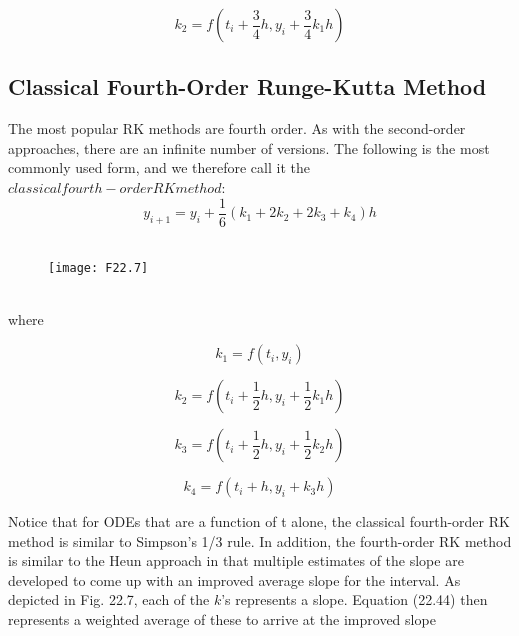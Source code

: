 \documentclass[../main.tex]{subfiles}
\begin{document}
\begin{equation}
\tag{22.43b}
k_2 = f \left(t_i + \dfrac{3}{4}h, y_i + \dfrac{3}{4}k_1h \right)
\end{equation}
 
 \subsection{Classical Fourth-Order Runge-Kutta Method}

 The most popular RK methods are fourth order. As with the second-order approaches, there
are an infinite number of versions. The following is the most commonly used form, and we
therefore call it the $classical fourth-order RK method$:
\begin{equation}
\tag{22.44}
y_{i+1} = y_i + \dfrac{1}{6} (k_1 + 2k_2 + 2k_3 + k_4)h
\end{equation}
\\
\begin{figure}[hbt!]
	\texttt{[image: F22.7]}
	\label{F22.7}
\end{figure}\\
 where

\begin{equation}
\tag{22.44a}
k_1 = f(t_i, y_i)
\end{equation}

\begin{equation}
\tag{22.44b}
k_2 = f \left(t_i + \dfrac{1}{2}h, y_i + \dfrac{1}{2} k_1h \right)
\end{equation}

\begin{equation}
\tag{22.44c}
k_3 = f \left(t_i + \dfrac{1}{2}h, y_i + \dfrac{1}{2} k_2h \right)
\end{equation}

\begin{equation}
\tag{22.44d}
k_4 = f(t_i + h, y_i + k_3h)
\end{equation}

Notice that for ODEs that are a function of t alone, the classical fourth-order RK
method is similar to Simpson's 1/3 rule. In addition, the fourth-order RK method is similar to the Heun approach in that multiple estimates of the slope are developed to come up
with an improved average slope for the interval. As depicted in Fig. 22.7, each of the $k$'s represents a slope. Equation (22.44) then represents a weighted average of these to arrive
at the improved slope\\
\end{document}
